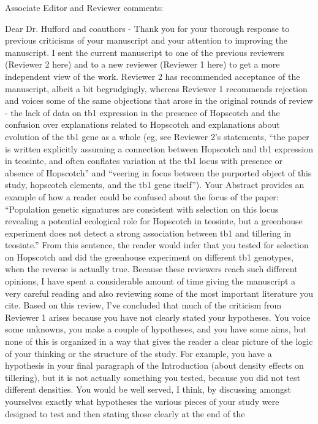 \documentclass[11pt]{article}
\begin{document}
Associate Editor and Reviewer comments:

Dear Dr. Hufford and coauthors - 
    Thank you for your thorough response to previous criticisms of your manuscript and your attention to improving the manuscript.  I sent the current manuscript to one of the previous reviewers (Reviewer 2 here) and to a new reviewer (Reviewer 1 here) to get a more independent view of the work.  Reviewer 2 has recommended acceptance of the manuscript, albeit a bit begrudgingly, whereas Reviewer 1 recommends rejection and voices some of the same objections that arose in the original rounds of review - the lack of data on tb1 expression in the presence of Hopscotch and the confusion over explanations related to Hopscotch and explanations about evolution of the tb1 gene as a whole (eg, see Reviewer 2’s statements, “the paper is written explicitly assuming a connection between Hopscotch and tb1 expression in teosinte, and often conflates variation at the tb1 locus with presence or absence of Hopscotch” and “veering in focus between the purported object of this study, hopscotch
elements, and the tb1 gene itself”).  Your Abstract provides an example of how a reader could be confused about the focus of the paper: “Population genetic signatures are consistent with selection on this locus revealing a potential ecological role for Hopscotch in teosinte, but a greenhouse experiment does not detect a strong association between tb1 and tillering in teosinte.”  From this sentence, the reader would infer that you tested for selection on Hopscotch and did the greenhouse experiment on different tb1 genotypes, when the reverse is actually true.
     Because these reviewers reach such different opinions, I have spent a considerable amount of time giving the manuscript a very careful reading and also reviewing some of the most important literature you cite.  Based on this review, I’ve concluded that much of the criticism from Reviewer 1 arises because you have not clearly stated your hypotheses.  You voice some unknowns, you make a couple of hypotheses, and you have some aims, but none of this is organized in a way that gives the reader a clear picture of the logic of your thinking or the structure of the study.  For example, you have a hypothesis in your final paragraph of the Introduction (about density effects on tillering), but it is not actually something you tested, because you did not test different densities.  You would be well served, I think, by discussing amongst yourselves exactly what hypotheses the various pieces of your study were designed to test and then stating those clearly at the end of the
\end{document}
